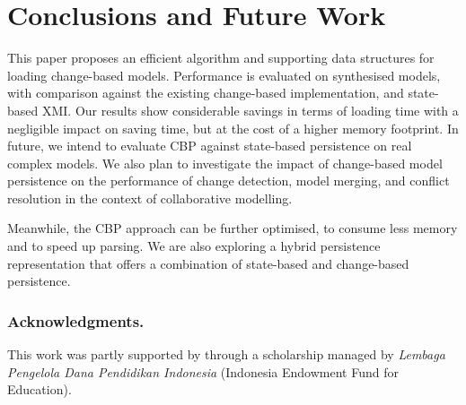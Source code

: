 \documentclass{llncs}
\begin{document}
    \section{Conclusions and Future Work}
    \label{sec:conclusions}
    This paper proposes an efficient algorithm and supporting data structures for loading change-based models.  Performance is evaluated on synthesised models, with comparison against the existing change-based implementation, and state-based XMI. 
    Our results show considerable savings in terms of loading time with a negligible impact on saving time, but at the cost of a higher memory footprint.  In future, we intend to evaluate CBP against state-based persistence on real complex models.  We also plan to investigate the impact of change-based model persistence on the performance of change detection, model merging, and conflict resolution in the context of collaborative modelling.
    
    Meanwhile, the CBP approach can be further optimised, to consume less memory and to speed up parsing.  We are also exploring a hybrid persistence representation that offers a combination of state-based and change-based persistence. 
    
    \subsubsection*{Acknowledgments.} This work was partly supported by through a scholarship managed by \emph{Lembaga Pengelola Dana Pendidikan Indonesia} (Indonesia Endowment Fund for Education).
     
    
   
\end{document}

